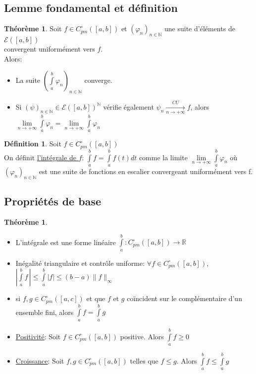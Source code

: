\documentclass[10pt,a4paper]{article}
\theoremstyle{definition}
\newtheorem{theorem}[proposition]{Théorème}
\newtheorem{definition}[proposition]{Définition}
\begin{document}
\subsection{Lemme fondamental et définition}
\begin{theorem}
Soit $f \in C_{pm}^{\circ}([a, b])$ et $(\varphi_n)_{n \in \mathbb{N}}$ une suite d'éléments de $\mathcal{E}([a, b])$ \\
convergent uniformément vers $f$. \\
Alors:
\begin{itemize}
\item La suite $(\int\limits_a^b \varphi_n)_{n \in \mathbb{N}}$ converge.
\item Si $(\psi)_{n \in \mathbb{N}} \in \mathcal{E}([a, b])^{\mathbb{N}}$ vérifie également $\psi_n \xrightarrow[n \to +\infty]{CU} f$, alors $\lim\limits_{n \to +\infty} \int\limits_a^b \varphi_n = \lim\limits_{n \to +\infty} \int\limits_a^b \varphi_n$
\end{itemize}
\end{theorem}
\begin{definition}
Soit $f \in C_{pm}^{\circ}([a, b])$ \\
On définit \uline{l'intégrale de $f$}: 
$\int\limits_a^b f = \int\limits_a^b f(t)dt$ comme la limite $\lim\limits_{n \to +\infty} \int\limits_a^b \varphi_n$ où $(\varphi_n)_{n \in \mathbb{N}}$ est une suite de fonctions en escalier convergeant uniformément vers f.
\end{definition}

\subsection{Propriétés de base}
\begin{theorem}
\hfill
\begin{itemize}
\item L'intégrale est une forme linéaire $\int\limits_a^b : C_{pm}^{\circ}([a, b]) \to \mathbb{R}$
\item Inégalité triangulaire et contrôle uniforme: $\forall f \in C_{pm}^{\circ}([a, b])$, $|\int\limits_a^b f \,| \leq \int\limits_a^b |f| \leq (b-a) \lVert f \rVert_\infty$
\item si $f, g \in C_{pm}^{\circ}([a, c])$ et que $f$ et $g$ coïncident sur le complémentaire d'un ensemble fini, alors $\int\limits_a^b f = \int\limits_a^b g$
\item \uline{Positivité}: Soit $f \in C_{pm}^{\circ}([a, b])$ positive. Alors $\int\limits_a^b f \geq 0$
\item \uline{Croissance}: Soit $f, g \in C_{pm}^{\circ}([a, b])$ telles que $f \leq g$. Alors $\int\limits_a^b f \leq \int\limits_a^b g$
\end{itemize}
\end{theorem}
\end{document}
